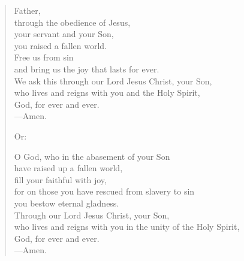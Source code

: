\prayer

\setlength{\leftmargini}{\prayerleftmargini}

\begin{verse}
Father,\\
through the obedience of Jesus,\\
your servant and your Son,\\
you raised a fallen world.\\
Free us from sin\\
and bring us the joy that lasts for ever.\\
We ask this through our Lord Jesus Christ, your Son,\\
who lives and reigns with you and the Holy Spirit,\\
God, for ever and ever.\\
{\color{red}---\thinspace}Amen.

{\color{red}Or:}

O God, who in the abasement of your Son\\
have raised up a fallen world,\\
fill your faithful with joy,\\
for on those you have rescued from slavery to sin\\
you bestow eternal gladness.\\
Through our Lord Jesus Christ, your Son,\\
who lives and reigns with you in the unity of the Holy Spirit,\\
God, for ever and ever.\\
{\color{red}---\thinspace}Amen.
\end{verse}

\setlength{\leftmargini}{\defleftmargini}